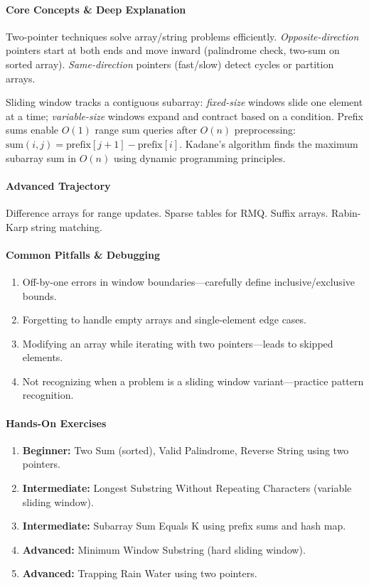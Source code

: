 \documentclass[11pt, a4paper, oneside]{report}
\begin{document}
\paragraph{Core Concepts \& Deep Explanation} Two-pointer techniques solve array/string problems efficiently. \emph{Opposite-direction} pointers start at both ends and move inward (palindrome check, two-sum on sorted array). \emph{Same-direction} pointers (fast/slow) detect cycles or partition arrays.

Sliding window tracks a contiguous subarray: \emph{fixed-size} windows slide one element at a time; \emph{variable-size} windows expand and contract based on a condition. Prefix sums enable $O(1)$ range sum queries after $O(n)$ preprocessing: $\text{sum}(i,j) = \text{prefix}[j{+}1] - \text{prefix}[i]$. Kadane's algorithm finds the maximum subarray sum in $O(n)$ using dynamic programming principles.

\paragraph{Advanced Trajectory} Difference arrays for range updates. Sparse tables for RMQ. Suffix arrays. Rabin-Karp string matching.

\paragraph{Common Pitfalls \& Debugging}
\begin{enumerate}[leftmargin=*]
\item Off-by-one errors in window boundaries---carefully define inclusive/exclusive bounds.
\item Forgetting to handle empty arrays and single-element edge cases.
\item Modifying an array while iterating with two pointers---leads to skipped elements.
\item Not recognizing when a problem is a sliding window variant---practice pattern recognition.
\end{enumerate}

\paragraph{Hands-On Exercises}
\begin{enumerate}[leftmargin=*]
\item \textbf{Beginner:} Two Sum (sorted), Valid Palindrome, Reverse String using two pointers.
\item \textbf{Intermediate:} Longest Substring Without Repeating Characters (variable sliding window).
\item \textbf{Intermediate:} Subarray Sum Equals K using prefix sums and hash map.
\item \textbf{Advanced:} Minimum Window Substring (hard sliding window).
\item \textbf{Advanced:} Trapping Rain Water using two pointers.
\end{enumerate}
\end{document}
